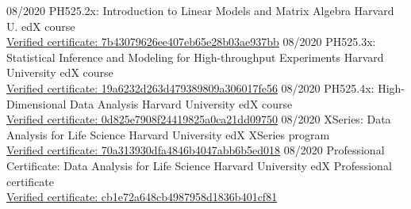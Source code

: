 \documentclass[]{friggeri-cv}
\begin{document}
\begin{entrylist}
\entry
    {08/2020}
    {PH525.2x: Introduction to Linear Models and Matrix Algebra}
    {Harvard U.}
    {edX course\\
    {\href{https://courses.edx.org/certificates/7b43079626ee407eb65e28b03ae937bb}{Verified certificate: 7b43079626ee407eb65e28b03ae937bb}}
    } 
\entry
    {08/2020}
    {PH525.3x: Statistical Inference and Modeling for High-throughput Experiments}
    {Harvard University}
    {edX course\\
    {\href{https://courses.edx.org/certificates/19a6232d263d479389809a306017fe56}{Verified certificate: 19a6232d263d479389809a306017fe56}}
    } 
    \entry
    {08/2020}
    {PH525.4x: High-Dimensional Data Analysis}
    {Harvard University}
    {edX course\\
    {\href{https://courses.edx.org/certificates/0d825e7908f24419825a0ca21dd09750}{Verified certificate: 0d825e7908f24419825a0ca21dd09750}}
    } 
    \entry
    {08/2020}
    {XSeries: Data Analysis for Life Science}
    {Harvard University}
    {edX XSeries program\\
    {\href{https://credentials.edx.org/credentials/70a313930dfa4846b4047abb6b5ed018/}{Verified certificate: 70a313930dfa4846b4047abb6b5ed018}}
    }
    \entry
    {08/2020}
    {Professional Certificate: Data Analysis for Life Science}
    {Harvard University}
    {edX Professional certificate\\
    {\href{https://credentials.edx.org/credentials/cb1e72a648cb4987958d1836b401cf81/}{Verified certificate: cb1e72a648cb4987958d1836b401cf81}}
    }
\end{entrylist}



\end{document}

